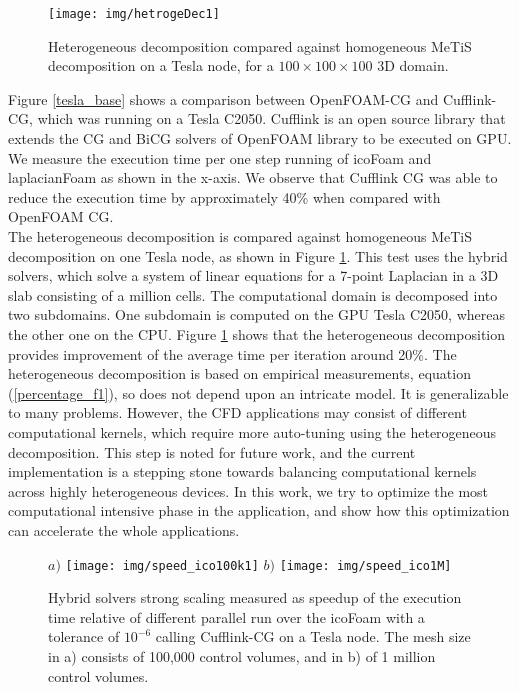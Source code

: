 \documentclass[3p,times]{elsarticle}
\begin{document}
\begin{figure}[h!]
\begin{center}
\texttt{[image: img/hetrogeDec1]} 
\caption{Heterogeneous decomposition compared against homogeneous MeTiS decomposition on a Tesla node, for a $100 \times 100 \times 100$ 3D domain. }
\label{heterodecom}
\end{center}
\end{figure}

Figure \ref{tesla_base} shows a comparison between OpenFOAM-CG and Cufflink-CG, which was running on a Tesla C2050. Cufflink is an open source library that extends the CG and BiCG solvers of OpenFOAM library to be executed on GPU. We measure the execution time per one step running of icoFoam and laplacianFoam as shown in the x-axis. We observe that Cufflink CG  was able to reduce the execution time by approximately 40\% when compared with OpenFOAM CG. \\

The heterogeneous decomposition is compared against homogeneous MeTiS decomposition on one Tesla node, as shown in Figure \ref{heterodecom}. This test uses the hybrid solvers, which solve a system of linear equations for a 7-point Laplacian in a 3D slab consisting of a million cells. The computational domain is decomposed into two subdomains. One subdomain is computed on the GPU Tesla C2050, whereas the other one on the CPU. Figure  \ref{heterodecom}  shows that the heterogeneous decomposition provides improvement of the average time per iteration around 20\%. The heterogeneous decomposition is based on empirical measurements, equation (\ref{percentage_f1}), so does not depend upon an intricate model. It is generalizable to many problems. However, the CFD applications may consist of different computational kernels, which require more auto-tuning using the heterogeneous decomposition. This step is noted for future work, and the current implementation is a stepping stone towards balancing computational kernels across highly heterogeneous devices. In this work, we try to optimize the most computational intensive phase in the application, and show how this optimization can accelerate the whole applications.  \\

\begin{figure}[h!]
\begin{center}
\emph{$a)$} \texttt{[image: img/speed\_ico100k1]}
\emph{$b)$} \texttt{[image: img/speed\_ico1M]}
\caption{Hybrid solvers strong scaling measured as speedup of the execution time relative of different parallel run over the icoFoam with a tolerance of $10^{-6}$ calling Cufflink-CG on a Tesla node. The mesh size in a) consists of 100,000 control volumes, and in b) of 1 million control volumes. }
\label{icospeedup}
\end{center}
\end{figure}  
\end{document}
